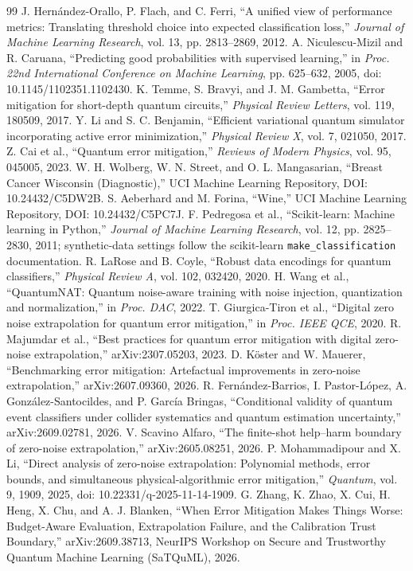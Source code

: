 \documentclass[conference]{IEEEtran}
\begin{document}
\begin{thebibliography}{99}
 J. Hern\'andez-Orallo, P. Flach, and C. Ferri, ``A unified view of performance metrics: Translating threshold choice into expected classification loss,'' \emph{Journal of Machine Learning Research}, vol. 13, pp. 2813--2869, 2012.
 A. Niculescu-Mizil and R. Caruana, ``Predicting good probabilities with supervised learning,'' in \emph{Proc. 22nd International Conference on Machine Learning}, pp. 625--632, 2005, doi: 10.1145/1102351.1102430.
 K. Temme, S. Bravyi, and J. M. Gambetta, ``Error mitigation for short-depth quantum circuits,'' \emph{Physical Review Letters}, vol. 119, 180509, 2017.
 Y. Li and S. C. Benjamin, ``Efficient variational quantum simulator incorporating active error minimization,'' \emph{Physical Review X}, vol. 7, 021050, 2017.
 Z. Cai et al., ``Quantum error mitigation,'' \emph{Reviews of Modern Physics}, vol. 95, 045005, 2023.
 W. H. Wolberg, W. N. Street, and O. L. Mangasarian, ``Breast Cancer Wisconsin (Diagnostic),'' UCI Machine Learning Repository, DOI: 10.24432/C5DW2B.
 S. Aeberhard and M. Forina, ``Wine,'' UCI Machine Learning Repository, DOI: 10.24432/C5PC7J.
 F. Pedregosa et al., ``Scikit-learn: Machine learning in Python,'' \emph{Journal of Machine Learning Research}, vol. 12, pp. 2825--2830, 2011; synthetic-data settings follow the scikit-learn \texttt{make\_classification} documentation.
 R. LaRose and B. Coyle, ``Robust data encodings for quantum classifiers,'' \emph{Physical Review A}, vol. 102, 032420, 2020.
 H. Wang et al., ``QuantumNAT: Quantum noise-aware training with noise injection, quantization and normalization,'' in \emph{Proc. DAC}, 2022.
 T. Giurgica-Tiron et al., ``Digital zero noise extrapolation for quantum error mitigation,'' in \emph{Proc. IEEE QCE}, 2020.
 R. Majumdar et al., ``Best practices for quantum error mitigation with digital zero-noise extrapolation,'' arXiv:2307.05203, 2023.
 D. K\"oster and W. Mauerer, ``Benchmarking error mitigation: Artefactual improvements in zero-noise extrapolation,'' arXiv:2607.09360, 2026.
 R. Fern\'andez-Barrios, I. Pastor-L\'opez, A. Gonz\'alez-Santocildes, and P. Garc\'ia Bringas, ``Conditional validity of quantum event classifiers under collider systematics and quantum estimation uncertainty,'' arXiv:2609.02781, 2026.
 V. Scavino Alfaro, ``The finite-shot help--harm boundary of zero-noise extrapolation,'' arXiv:2605.08251, 2026.
 P. Mohammadipour and X. Li, ``Direct analysis of zero-noise extrapolation: Polynomial methods, error bounds, and simultaneous physical-algorithmic error mitigation,'' \emph{Quantum}, vol. 9, 1909, 2025, doi: 10.22331/q-2025-11-14-1909.
 G. Zhang, K. Zhao, X. Cui, H. Heng, X. Chu, and A. J. Blanken, ``When Error Mitigation Makes Things Worse: Budget-Aware Evaluation, Extrapolation Failure, and the Calibration Trust Boundary,'' arXiv:2609.38713, NeurIPS Workshop on Secure and Trustworthy Quantum Machine Learning (SaTQuML), 2026.
\end{thebibliography}
\end{document}
